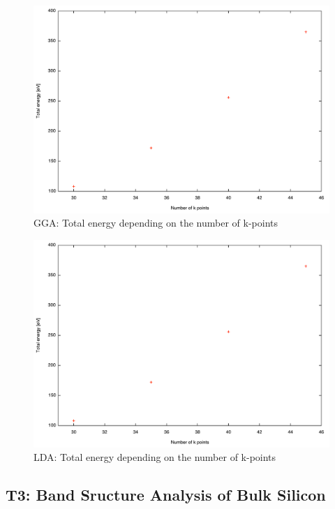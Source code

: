 \documentclass[12pt,a4paper]{scrartcl}
\begin{document}
\begin{figure}[H]
\begin{center}
\includegraphics[width=12.0cm]{plots/GGA_kgrid.pdf}
\end{center}
\caption{GGA: Total energy depending on the number of k-points}
\end{figure}
\begin{figure}[H]
\begin{center}
\includegraphics[width=12.0cm]{plots/LDA_kgrid.pdf}
\end{center}
\caption{LDA: Total energy depending on the number of k-points}
\end{figure}







\subsection{T3: Band Sructure Analysis of Bulk Silicon}
\end{document}
